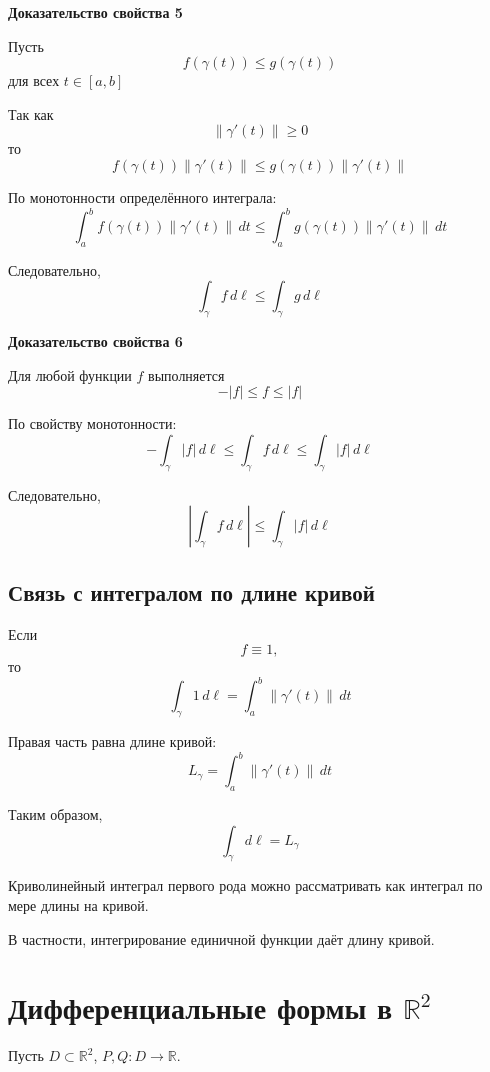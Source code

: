 \documentclass[12pt,a4paper]{article}
\begin{document}
\textbf{Доказательство свойства 5}

\begin{proofbox}
Пусть
\[
f(\gamma(t))\leq g(\gamma(t))
\]
для всех $t\in[a,b]$

Так как
\[
\|\gamma'(t)\|\geq0
\]
то
\[
f(\gamma(t))\|\gamma'(t)\|
\leq
g(\gamma(t))\|\gamma'(t)\|
\]

По монотонности определённого интеграла:
\[
\int_a^b
f(\gamma(t))\|\gamma'(t)\|\,dt
\leq
\int_a^b
g(\gamma(t))\|\gamma'(t)\|\,dt
\]

Следовательно,
\[
\int_\gamma f\,d\ell
\leq
\int_\gamma g\,d\ell
\]
\end{proofbox}

\textbf{Доказательство свойства 6}

\begin{proofbox}
Для любой функции $f$ выполняется
\[
-|f|\leq f\leq|f|
\]

По свойству монотонности:
\[
-\int_\gamma|f|\,d\ell
\leq
\int_\gamma f\,d\ell
\leq
\int_\gamma|f|\,d\ell
\]

Следовательно,
\[
\left|\int_\gamma f\,d\ell\right|
\leq
\int_\gamma|f|\,d\ell
\]
\end{proofbox}

\subsection{Связь с интегралом по длине кривой}

Если
\[
f\equiv1,
\]
то
\[
\int_\gamma 1\,d\ell
=
\int_a^b\|\gamma'(t)\|\,dt
\]

Правая часть равна длине кривой:
\[
L_\gamma=\int_a^b\|\gamma'(t)\|\,dt
\]

Таким образом,
\[
\int_\gamma d\ell=L_\gamma
\]

\begin{note}
Криволинейный интеграл первого рода можно рассматривать как интеграл по мере длины на кривой.

В частности, интегрирование единичной функции даёт длину кривой.
\end{note}

\newpage

\section{Дифференциальные формы в $\mathbb{R}^2$}

Пусть $D \subset \mathbb{R}^2$, $P,Q \colon D \to \mathbb{R}$.
\end{document}

